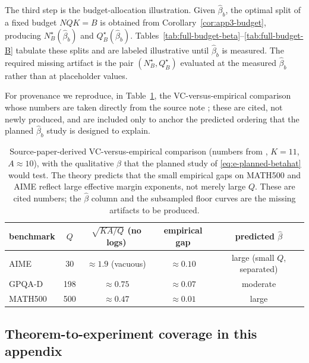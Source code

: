 \documentclass{article} %
\begin{document}
The third step is the budget-allocation illustration.  Given $\widehat\beta_b$,
the optimal split of a fixed budget $NQK=B$ is obtained from
Corollary~\ref{cor:app3-budget}, producing $N_B^\star(\widehat\beta_b)$ and
$Q_B^\star(\widehat\beta_b)$.  Tables~\ref{tab:full-budget-beta}--\ref{tab:full-budget-B} tabulate these splits and
are labeled illustrative until $\widehat\beta_b$ is measured.  The required
missing artifact is the pair $(N_B^\star,Q_B^\star)$ evaluated at the measured
$\widehat\beta_b$ rather than at placeholder values.

For provenance we reproduce, in Table~\ref{tab:planned-provenance}, the
VC-versus-empirical comparison whose numbers are taken directly from the source
note \cite{komiyama2026best}; these are cited, not newly produced, and are
included only to anchor the predicted ordering that the planned
$\widehat\beta_b$ study is designed to explain.

\begin{table}[t]
\centering
\small
\begin{tabular}{lcccc}
\toprule
benchmark & $Q$ & $\sqrt{KA/Q}$ (no logs) & empirical gap \cite{komiyama2026best} & predicted $\widehat\beta$ \\
\midrule
AIME    & 30  & $\approx 1.9$ (vacuous) & $\approx 0.10$ & large (small $Q$, separated) \\
GPQA-D  & 198 & $\approx 0.75$          & $\approx 0.07$ & moderate \\
MATH500 & 500 & $\approx 0.47$          & $\approx 0.01$ & large \\
\bottomrule
\end{tabular}
\caption{Source-paper-derived VC-versus-empirical comparison
(numbers from \cite{komiyama2026best}, $K=11$, $A\approx 10$), with the
qualitative $\widehat\beta$ that the planned study of
\eqref{eq:e-planned-betahat} would test.  The theory predicts that the small
empirical gaps on MATH500 and AIME reflect large effective margin exponents,
not merely large $Q$.  These are cited numbers; the $\widehat\beta$ column and
the subsampled floor curves are the missing artifacts to be produced.}
\label{tab:planned-provenance}
\end{table}

\subsection{Theorem-to-experiment coverage in this appendix}
\label{app:exp-coverage}
\end{document}
